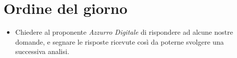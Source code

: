 \section{Ordine del giorno}

\begin{itemize}
    \item Chiedere al proponente \emph{Azzurro Digitale} di rispondere ad alcune nostre domande, e segnare le risposte ricevute così da poterne svolgere una successiva analisi.
\end{itemize}